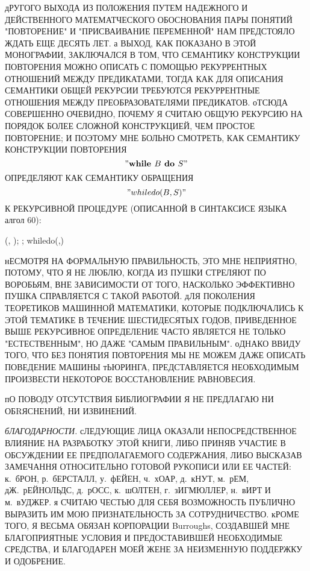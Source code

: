 дРУГОГО ВЫХОДА ИЗ ПОЛОЖЕНИЯ ПУТЕМ НАДЕЖНОГО И ДЕЙСТВЕННОГО МАТЕМАТЧЕСКОГО 
ОБОСНОВАНИЯ ПАРЫ ПОНЯТИЙ "ПОВТОРЕНИЕ" И  "ПРИСВАИВАНИЕ ПЕРЕМЕННОЙ"
НАМ ПРЕДСТОЯЛО ЖДАТЬ ЕЩЕ ДЕСЯТЬ ЛЕТ. а ВЫХОД, КАК ПОКАЗАНО В ЭТОЙ МОНОГРАФИИ, 
ЗАКЛЮЧАЛСЯ В ТОМ, ЧТО СЕМАНТИКУ КОНСТРУКЦИИ ПОВТОРЕНИЯ МОЖНО ОПИСАТЬ С
ПОМОЩЬЮ РЕКУРРЕНТНЫХ ОТНОШЕНИЙ МЕЖДУ ПРЕДИКАТАМИ, ТОГДА КАК ДЛЯ ОПИСАНИЯ 
СЕМАНТИКИ ОБЩЕЙ РЕКУРСИИ ТРЕБУЮТСЯ РЕКУРРЕНТНЫЕ ОТНОШЕНИЯ МЕЖДУ
ПРЕОБРАЗОВАТЕЛЯМИ ПРЕДИКАТОВ. оТСЮДА СОВЕРШЕННО ОЧЕВИДНО, ПОЧЕМУ  Я СЧИТАЮ 
ОБЩУЮ РЕКУРСИЮ НА ПОРЯДОК БОЛЕЕ СЛОЖНОЙ КОНСТРУКЦИЕЙ, ЧЕМ ПРОСТОЕ
ПОВТОРЕНИЕ; И ПОЭТОМУ МНЕ БОЛЬНО СМОТРЕТЬ, КАК СЕМАНТИКУ КОНСТРУКЦИИ 
ПОВТОРЕНИЯ
$$
"\kwd{while } B \kwd{ do } S"
$$
ОПРЕДЕЛЯЮТ  КАК СЕМАНТИКУ ОБРАЩЕНИЯ
$$
"whiledo(B,S)"
$$
К РЕКУРСИВНОЙ ПРОЦЕДУРЕ (ОПИСАННОЙ В СИНТАКСИСЕ ЯЗЫКА алгол 60):
{\obeylines
{} (, );
      ;
       whiledo(,) 

}
нЕСМОТРЯ НА ФОРМАЛЬНУЮ ПРАВИЛЬНОСТЬ, ЭТО МНЕ НЕПРИЯТНО, ПОТОМУ, ЧТО Я НЕ 
ЛЮБЛЮ, КОГДА ИЗ ПУШКИ СТРЕЛЯЮТ ПО ВОРОБЬЯМ, ВНЕ ЗАВИСИМОСТИ ОТ ТОГО, НАСКОЛЬКО
ЭФФЕКТИВНО ПУШКА СПРАВЛЯЕТСЯ С ТАКОЙ РАБОТОЙ. дЛЯ ПОКОЛЕНИЯ ТЕОРЕТИКОВ 
МАШИННОЙ МАТЕМАТИКИ, КОТОРЫЕ ПОДКЛЮЧАЛИСЬ К ЭТОЙ ТЕМАТИКЕ В ТЕЧЕНИЕ
ШЕСТИДЕСЯТЫХ ГОДОВ, ПРИВЕДЕННОЕ ВЫШЕ РЕКУРСИВНОЕ ОПРЕДЕЛЕНИЕ ЧАСТО ЯВЛЯЕТСЯ 
НЕ ТОЛЬКО "ЕСТЕСТВЕННЫМ",  НО ДАЖЕ "САМЫМ ПРАВИЛЬНЫМ". оДНАКО ВВИДУ ТОГО, ЧТО 
БЕЗ ПОНЯТИЯ ПОВТОРЕНИЯ МЫ НЕ МОЖЕМ ДАЖЕ ОПИСАТЬ ПОВЕДЕНИЕ  МАШИНЫ тЬЮРИНГА,
ПРЕДСТАВЛЯЕТСЯ НЕОБХОДИМЫМ ПРОИЗВЕСТИ НЕКОТОРОЕ ВОССТАНОВЛЕНИЕ РАВНОВЕСИЯ.

пО ПОВОДУ ОТСУТСТВИЯ БИБЛИОГРАФИИ Я НЕ ПРЕДЛАГАЮ НИ ОБRЯСНЕНИЙ, НИ ИЗВИНЕНИЙ.


{\sl бЛАГОДАРНОСТИ.} сЛЕДУЮЩИЕ ЛИЦА ОКАЗАЛИ НЕПОСРЕДСТВЕННОЕ ВЛИЯНИЕ НА 
РАЗРАБОТКУ ЭТОЙ КНИГИ, ЛИБО ПРИНЯВ УЧАСТИЕ В ОБСУЖДЕНИИ ЕЕ ПРЕДПОЛАГАЕМОГО 
СОДЕРЖАНИЯ, ЛИБО ВЫСКАЗАВ ЗАМЕЧАННЯ ОТНОСИТЕЛЬНО ГОТОВОЙ РУКОПИСИ ИЛИ ЕЕ
ЧАСТЕЙ: к.~бРОН, р.~бЕРСТАЛЛ, у.~фЕЙЕН, ч.~хОАР, д.~кНУТ, м.~рЕМ, 
дЖ.~рЕЙНОЛЬДС, д.~рОСС, к.~шОЛТЕН, г.~зИГМЮЛЛЕР, н.~вИРТ И м.~вУДЖЕР. 
я СЧИТАЮ ЧЕСТЬЮ ДЛЯ СЕБЯ ВОЗМОЖНОСТЬ ПУБЛИЧНО ВЫРАЗИТЬ ИМ МОЮ ПРИЗНАТЕЛЬНОСТЬ 
ЗА СОТРУДНИЧЕСТВО. кРОМЕ ТОГО, Я ВЕСЬМА ОБЯЗАН КОРПОРАЦИИ Burroughs,
СОЗДАВШЕЙ МНЕ БЛАГОПРИЯТНЫЕ УСЛОВИЯ И ПРЕДОСТАВИВШЕЙ  НЕОБХОДИМЫЕ СРЕДСТВА, 
И БЛАГОДАРЕН МОЕЙ ЖЕНЕ ЗА НЕИЗМЕННУЮ ПОДДЕРЖКУ И ОДОБРЕНИЕ.

\bye
